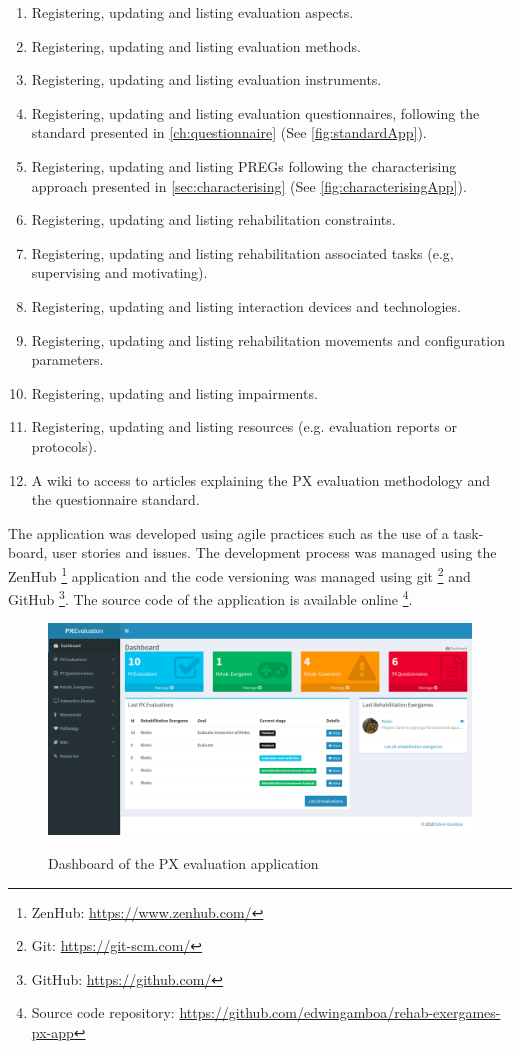 \begin{enumerate}
    \item Registering, updating and listing evaluation aspects.
    \item Registering, updating and listing evaluation methods.
    \item Registering, updating and listing evaluation instruments.
    \item Registering, updating and listing evaluation questionnaires, following the standard presented in \autoref{ch:questionnaire} (See \autoref{fig:standardApp}).
    \item Registering, updating and listing \acp{PREG} following the characterising approach presented in \autoref{sec:characterising} (See \autoref{fig:characterisingApp}).
    \item Registering, updating and listing rehabilitation constraints.
    \item Registering, updating and listing rehabilitation associated tasks (e.g, supervising and motivating).
    \item Registering, updating and listing interaction devices and technologies.
    \item Registering, updating and listing rehabilitation movements and configuration parameters.
    \item Registering, updating and listing impairments.
    \item Registering, updating and listing resources (e.g. evaluation reports or protocols).
    \item A wiki to access to articles explaining the \ac{PX} evaluation methodology and the questionnaire standard.
\end{enumerate}

The application was developed using agile practices such as the use of a task-board, user stories and issues. The development process was managed using the ZenHub \footnote{ZenHub: \url{https://www.zenhub.com/}} application and the code versioning was managed using git \footnote{Git: \url{https://git-scm.com/}} and GitHub \footnote{GitHub: \url{https://github.com/}}. The source code of the application is available online \footnote{Source code repository: \url{https://github.com/edwingamboa/rehab-exergames-px-app}}.

\begin{figure}[bth]
\myfloatalign
{\includegraphics[width=\linewidth]{gfx/app/dashboardApp}} \quad
\caption{Dashboard of the \ac{PX} evaluation application}\label{fig:dashboardApp}
\end{figure}

